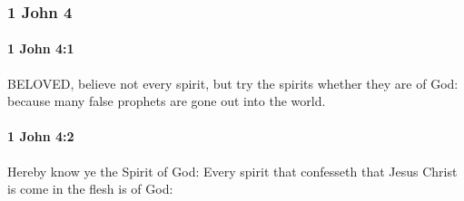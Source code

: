 	\subsubsection{1 John 4} %
		\label{1JOHN-4}
		
		\paragraph{1 John 4:1} %
			\label{1JOHN-4-1}

			BELOVED, believe not every spirit, but try the spirits whether they are of God: because many false prophets are gone out into the world.

			\begin{framed}
			\scriptsize
				\begin{compactdesc}
					\item[SBLG] 
				\end{compactdesc}
			\end{framed}

		\paragraph{1 John 4:2} %
			\label{1JOHN-4-2}

			Hereby know ye the Spirit of God: Every spirit that confesseth that Jesus Christ is come in the flesh is of God:

